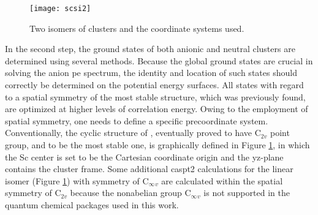 \begin{refsection}
 


 \begin{figure}[htb!]
	\centering
	\texttt{[image: scsi2]}
	\caption{Two isomers of  clusters and the coordinate systems used.}
	\label{fig3:scsi2}
\end{figure}





In the second step, the ground states of both anionic and neutral clusters  are determined using several methods. Because the global ground states are crucial in solving the anion \acrshort{pe} spectrum, the identity and location of such states should correctly be determined on the potential energy surfaces. All states with regard to a spatial symmetry of the most stable structure, which was previously found, are optimized at higher levels of correlation energy. Owing to the employment of spatial symmetry, one needs to define a specific precoordinate system. Conventionally, the cyclic structure of , eventually proved to have C$_{2v}$ point group, and to be the most stable one, is graphically defined in Figure \ref{fig3:scsi2}, in which the Sc center is set to be the Cartesian coordinate origin and the yz-plane contains the cluster frame. Some additional \acrshort{caspt2} calculations for the linear isomer (Figure \ref{fig3:scsi2}) with symmetry of C$_\infty$$_v$ are calculated within the spatial symmetry of C$_{2v}$ because the nonabelian group C$_\infty$$_v$ is not supported in the quantum chemical packages used in this work.





\end{refsection}
